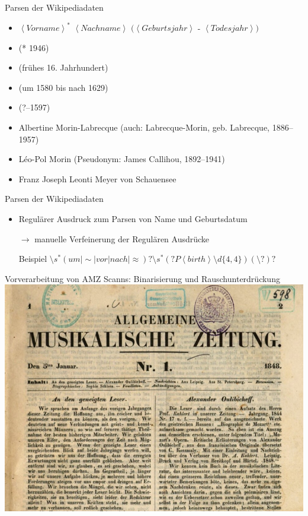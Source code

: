 \documentclass[aspectratio=169]{beamer}
\begin{document}
\begin{frame}{Parsen der Wikipediadaten}
	\begin{itemize}
		\item $ \left\langle Vorname\right\rangle ^* $   $\left\langle Nachname\right\rangle$ $(\left\langle Geburtsjahr\right\rangle$ - $\left\langle Todesjahr\right\rangle )$
		\item (* 1946)
		\item (frühes 16. Jahrhundert)
		\item (um 1580 bis nach 1629)
		\item (?–1597)
		\item Albertine Morin-Labrecque (auch: Labrecque-Morin, geb. Labrecque, 1886–1957)
		\item Léo-Pol Morin (Pseudonym: James Callihou, 1892–1941)
		\item Franz Joseph Leonti Meyer von Schauensee 
	\end{itemize}
\end{frame}
\begin{frame}{Parsen der Wikipediadaten}
	\begin{itemize}
			\item Regulärer Ausdruck zum Parsen von Name und Geburtsdatum
			\item[$\rightarrow$ ] manuelle Verfeinerung der Regulären Ausdrücke
			\item[Beispiel   ] $ \setminus s^*(um|\sim |vor|nach| \approx )?\setminus s^*(?P\left\langle birth\right \rangle \setminus d\{4,4\})(\setminus?)? $
	\end{itemize}
\end{frame}
\begin{frame}{Vorverarbeitung von AMZ Scanns: Binarisierung und Rauschunterdrückung}
	\includegraphics[scale=.36]{"data/unbinarisiert.png"}
\end{frame}
\end{document}
